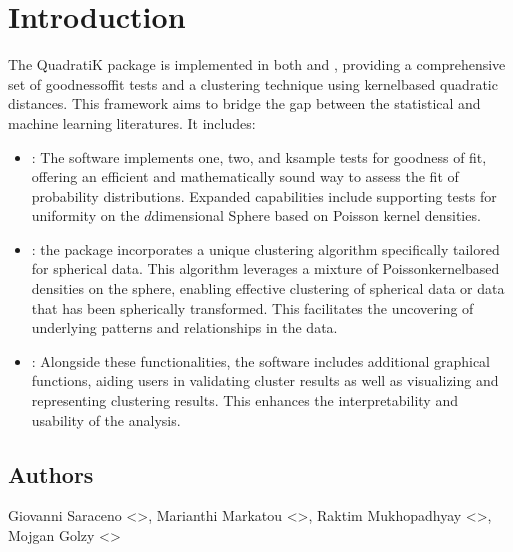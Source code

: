 \documentclass[letterpaper,10pt,english,openany,oneside]{sphinxmanual}
\begin{document}
{{{{\chapter{Introduction}
\label{\detokenize{index:introduction}}
\sphinxAtStartPar
The QuadratiK package is implemented in both  and , providing a comprehensive set of goodness\sphinxhyphen{}of\sphinxhyphen{}fit tests and a clustering technique using kernel\sphinxhyphen{}based quadratic distances. This framework aims to bridge the gap between the statistical and machine learning literatures. It includes:
\begin{itemize}
\item {} 
\sphinxAtStartPar
{} : The software implements one, two, and k\sphinxhyphen{}sample tests for goodness of fit, offering an efficient and mathematically sound way to assess the fit of probability distributions. Expanded capabilities include supporting tests for uniformity on the \(d\)\sphinxhyphen{}dimensional Sphere based on Poisson kernel densities.

\item {} 
\sphinxAtStartPar
{}: the package incorporates a unique clustering algorithm specifically tailored for spherical data. This algorithm leverages a mixture of Poisson\sphinxhyphen{}kernel\sphinxhyphen{}based densities on the sphere, enabling effective clustering of spherical data or data that has been spherically transformed. This facilitates the uncovering of underlying patterns and relationships in the data.

\item {} 
\sphinxAtStartPar
{}: Alongside these functionalities, the software includes additional graphical functions, aiding users in validating cluster results as well as visualizing and representing clustering results. This enhances the interpretability and usability of the analysis.

\end{itemize}


\section{Authors}
\label{\detokenize{index:authors}}
\sphinxAtStartPar
Giovanni Saraceno \textless{}\textgreater{}, Marianthi Markatou \textless{}\textgreater{}, Raktim Mukhopadhyay \textless{}\textgreater{}, Mojgan Golzy \textless{}\textgreater{}

}}}}
\end{document}
